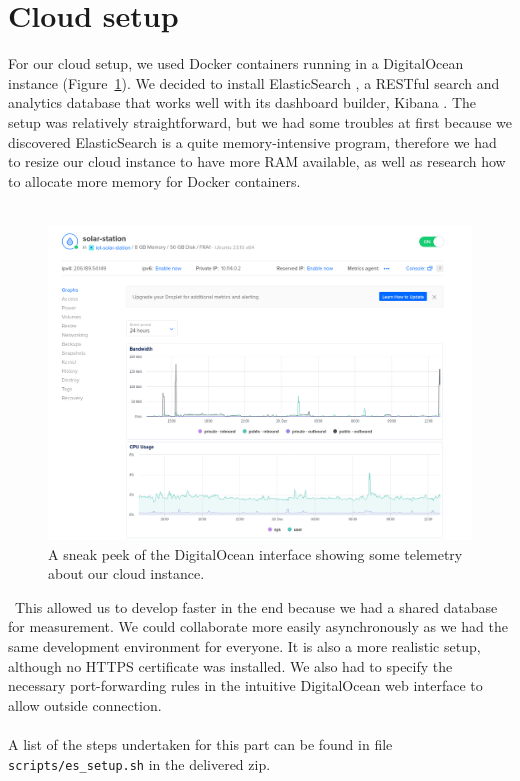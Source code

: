 \section*{Cloud setup}

For our cloud setup, we used Docker \cite{docker} containers running in a DigitalOcean \cite{do} instance (Figure~\ref{fig:do}).
We decided to install ElasticSearch \cite{es}, a RESTful search and analytics database that works well with its dashboard builder, Kibana \cite{kibana}.
The setup was relatively straightforward, but we had some troubles at first because we discovered ElasticSearch is a quite memory-intensive program, therefore we had to resize our cloud instance to have more RAM available, as well as research how to allocate more memory for Docker containers. \\ \\
\begin{figure}[H]
    \centering
    \includegraphics[width=15cm]{../assets/png/digital-ocean-graph}
    \caption{A sneak peek of the DigitalOcean interface showing some telemetry about our cloud instance.}
    \label{fig:do}
\end{figure}\
This allowed us to develop faster in the end because we had a shared database for measurement.
We could collaborate more easily asynchronously as we had the same development environment for everyone.
It is also a more realistic setup, although no HTTPS certificate was installed.
We also had to specify the necessary port-forwarding rules in the intuitive DigitalOcean web interface to allow outside connection. \\ \\
A list of the steps undertaken for this part can be found in file \texttt{scripts/es\_setup.sh} in the delivered zip.
